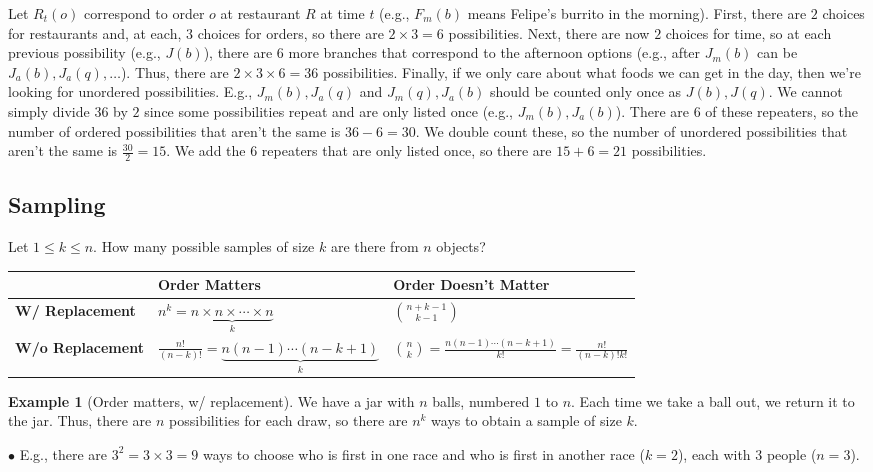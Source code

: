 \documentclass[12pt,oneside]{article}
\theoremstyle{definition}
\newtheorem{example}{Example}
\theoremstyle{remark}
\begin{document}
\begin{solutionbox}
Let $R_t(o)$ correspond to order $o$ at restaurant $R$ at time $t$ (e.g., $F_m(b)$ means Felipe's burrito in the morning). First, there are $2$ choices for restaurants and, at each, $3$ choices for orders, so there are $2 \times 3 = 6$ possibilities. Next, there are now $2$ choices for time, so at each previous possibility (e.g., $J(b)$), there are $6$ more branches that correspond to the afternoon options (e.g., after $J_m(b)$ can be $J_a(b), J_a(q), \ldots$). Thus, there are $2 \times 3 \times 6 = 36$ possibilities. Finally, if we only care about what foods we can get in the day, then we're looking for unordered possibilities. E.g., $J_m(b), J_a(q)$ and $J_m(q), J_a(b)$ should be counted only once as $J(b), J(q)$. We cannot simply divide $36$ by $2$ since some possibilities repeat and are only listed once (e.g., $J_m(b), J_a(b)$). There are $6$ of these repeaters, so the number of ordered possibilities that aren't the same is $36 - 6 = 30$. We double count these, so the number of unordered possibilities that aren't the same is $\frac{30}{2} = 15$. We add the $6$ repeaters that are only listed once, so there are $15 + 6 = 21$ possibilities.
\end{solutionbox}

\subsection{Sampling}

Let $1 \leq k \leq n$. How many possible samples of size $k$ are there from $n$ objects?

\begin{center}
\renewcommand{\arraystretch}{1.5}
\begin{tabular}{p{4cm}|p{6cm}|p{6cm}}
& \textbf{Order Matters} & \textbf{Order Doesn't Matter} \\ \hline

\textbf{W/ Replacement}
& $n^k = \underbrace{n \times n \times \cdots \times n}_{k}$
& $\binom{n + k - 1}{k - 1}$ \\

\hline

\textbf{W/o Replacement}
& $\frac{n!}{(n - k)!} = \underbrace{n(n - 1) \cdots (n - k + 1)}_{k}$
& $\binom{n}{k} = \frac{n (n - 1) \cdots (n - k + 1)}{k!} = \frac{n!}{(n - k)! k!}$
\end{tabular}
\end{center}

\begin{example}[Order matters, w/ replacement]
We have a jar with $n$ balls, numbered $1$ to $n$. Each time we take a ball out, we return it to the jar. Thus, there are $n$ possibilities for each draw, so there are $n^k$ ways to obtain a sample of size $k$.

$\bullet$ E.g., there are $3^2 = 3 \times 3 = 9$ ways to choose who is first in one race and who is first in another race ($k = 2$), each with 3 people ($n = 3$). 
\end{example}
\end{document}
